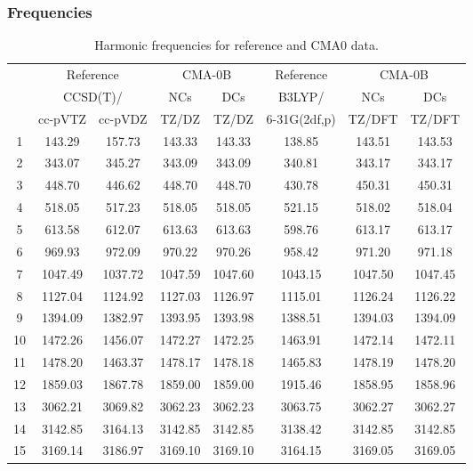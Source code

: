 \documentclass[10pt,oneside]{article}
\begin{document}
\subsubsection*{Frequencies}
\begin{table}[h!]
\centering
\caption{Harmonic frequencies for reference and CMA0 data.}
\begin{tabular}{cccccccc}
\toprule
{} & \multicolumn{2}{c}{Reference} & \multicolumn{2}{c}{CMA-0B} &    Reference & \multicolumn{2}{c}{CMA-0B} \\
{} & \multicolumn{2}{c}{CCSD(T)/} &     NCs &     DCs &       B3LYP/ &     NCs &     DCs \\
{} &   cc-pVTZ & cc-pVDZ &   TZ/DZ &   TZ/DZ & 6-31G(2df,p) &  TZ/DFT &  TZ/DFT \\
\midrule
1  &    143.29 &  157.73 &  143.33 &  143.33 &       138.85 &  143.51 &  143.53 \\
2  &    343.07 &  345.27 &  343.09 &  343.09 &       340.81 &  343.17 &  343.17 \\
3  &    448.70 &  446.62 &  448.70 &  448.70 &       430.78 &  450.31 &  450.31 \\
4  &    518.05 &  517.23 &  518.05 &  518.05 &       521.15 &  518.02 &  518.04 \\
5  &    613.58 &  612.07 &  613.63 &  613.63 &       598.76 &  613.17 &  613.17 \\
6  &    969.93 &  972.09 &  970.22 &  970.26 &       958.42 &  971.20 &  971.18 \\
7  &   1047.49 & 1037.72 & 1047.59 & 1047.60 &      1043.15 & 1047.50 & 1047.45 \\
8  &   1127.04 & 1124.92 & 1127.03 & 1126.97 &      1115.01 & 1126.24 & 1126.22 \\
9  &   1394.09 & 1382.97 & 1393.95 & 1393.98 &      1388.51 & 1394.03 & 1394.09 \\
10 &   1472.26 & 1456.07 & 1472.27 & 1472.25 &      1463.91 & 1472.14 & 1472.11 \\
11 &   1478.20 & 1463.37 & 1478.17 & 1478.18 &      1465.83 & 1478.19 & 1478.20 \\
12 &   1859.03 & 1867.78 & 1859.00 & 1859.00 &      1915.46 & 1858.95 & 1858.96 \\
13 &   3062.21 & 3069.82 & 3062.23 & 3062.23 &      3063.75 & 3062.27 & 3062.27 \\
14 &   3142.85 & 3164.13 & 3142.85 & 3142.85 &      3138.42 & 3142.85 & 3142.85 \\
15 &   3169.14 & 3186.97 & 3169.10 & 3169.10 &      3164.15 & 3169.05 & 3169.05 \\
\bottomrule
\end{tabular}
\end{table}
\end{document}
